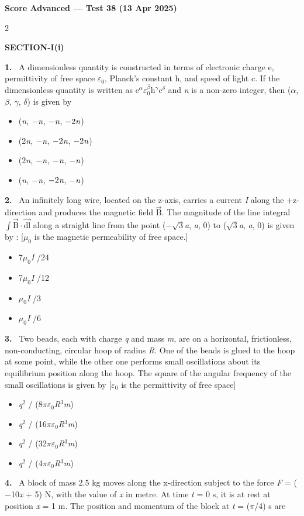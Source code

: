 \documentclass[10pt]{extarticle}
\newcommand{\papersec}[1]{\par\bigskip{\centering\Large\bfseries PAPER-#1\par}\medskip}
\newcommand{\partsec}[2]{\par\medskip\noindent{\large\bfseries PART-#1: #2}\par\smallskip}
\newcommand{\sect}[1]{\par\smallskip\noindent\textbf{#1}\par}
\newcommand{\qn}[1]{\par\smallskip\noindent\textbf{#1.}~}
\newenvironment{qoptions}{\begin{itemize}[leftmargin=1.8em,itemsep=1pt,topsep=2pt,label={}]}{\end{itemize}}
\newcommand{\opt}[2]{\item[(#1)] #2}
\begin{document}
\begin{center}{\Large\bfseries Score Advanced --- Test 38 (13 Apr 2025)}\end{center}
\begin{multicols}{2}
\raggedcolumns
\papersec{1}
\partsec{1}{PHYSICS}
\sect{SECTION-I(i)}
\qn{1} A dimensionless quantity is constructed in terms of electronic charge e, permittivity of free space $\varepsilon_0$, Planck's constant h, and speed of light c. If the dimensionless quantity is written as e$^\alpha\varepsilon_0^\beta$h$^\gamma$c$^\delta$ and \textit{n} is a non-zero integer, then ($\alpha$, $\beta$, $\gamma$, $\delta$) is given by
\begin{qoptions}
\opt{A}{(\textit n, $-\textit n$, $-\textit n$, $-2\textit n$)}
\opt{B}{(2\textit n, $-\textit n$, $-2\textit n$, $-2\textit n$)}
\opt{C}{(2\textit n, $-\textit n$, $-\textit n$, $-\textit n$)}
\opt{D}{(\textit n, $-\textit n$, $-2\textit n$, $-\textit n$)}
\end{qoptions}
\qn{2} An infinitely long wire, located on the z-axis, carries a current \textit I along the +z-direction and produces the magnetic field $\vec{\mathrm B}$. The magnitude of the line integral $\displaystyle\int\vec{\mathrm B}\cdot\overrightarrow{\mathrm{dl}}$ along a straight line from the point ($-\sqrt3$\textit a, \textit a, 0) to ($\sqrt3$\textit a, \textit a, 0) is given by : [$\mu_0$ is the magnetic permeability of free space.]
\begin{qoptions}
\opt{A}{7$\mu_0$\textit I /24}
\opt{B}{7$\mu_0$\textit I /12}
\opt{C}{$\mu_0$\textit I /3}
\opt{D}{$\mu_0$\textit I /6}
\end{qoptions}
\qn{3} Two beads, each with charge \textit q and mass \textit m, are on a horizontal, frictionless, non-conducting, circular hoop of radius \textit R. One of the beads is glued to the hoop at some point, while the other one performs small oscillations about its equilibrium position along the hoop. The square of the angular frequency of the small oscillations is given by [$\varepsilon_0$ is the permittivity of free space]
\begin{qoptions}
\opt{A}{\textit q$^2$ / (8$\pi\varepsilon_0$\textit R$^3$\textit m)}
\opt{B}{\textit q$^2$ / (16$\pi\varepsilon_0$\textit R$^3$\textit m)}
\opt{C}{\textit q$^2$ / (32$\pi\varepsilon_0$\textit R$^3$\textit m)}
\opt{D}{\textit q$^2$ / (4$\pi\varepsilon_0$\textit R$^3$\textit m)}
\end{qoptions}
\qn{4} A block of mass 2.5 kg moves along the x-direction subject to the force \textit F = ($-$10\textit x + 5) N, with the value of \textit x in metre. At time \textit t = 0 s, it is at rest at position \textit x = 1 m. The position and momentum of the block at \textit t = ($\pi$/4) s are

\end{multicols}
\end{document}
